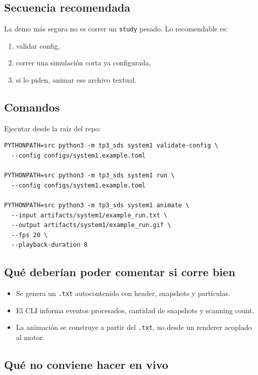 \documentclass[11pt]{article}
\begin{document}
\subsection{Secuencia recomendada}

La demo m\'as segura no es correr un \texttt{study} pesado. Lo recomendable es:

\begin{enumerate}
  \item validar config,
  \item correr una simulaci\'on corta ya configurada,
  \item si lo piden, animar ese archivo textual.
\end{enumerate}

\subsection{Comandos}

Ejecutar desde la ra\'iz del repo:

\begin{verbatim}
PYTHONPATH=src python3 -m tp3_sds system1 validate-config \
  --config configs/system1.example.toml

PYTHONPATH=src python3 -m tp3_sds system1 run \
  --config configs/system1.example.toml

PYTHONPATH=src python3 -m tp3_sds system1 animate \
  --input artifacts/system1/example_run.txt \
  --output artifacts/system1/example_run.gif \
  --fps 20 \
  --playback-duration 8
\end{verbatim}

\subsection{Qu\'e deber\'ian poder comentar si corre bien}

\begin{itemize}
  \item Se genera un \texttt{.txt} autocontenido con header, snapshots y part\'iculas.
  \item El CLI informa eventos procesados, cantidad de snapshots y scanning count.
  \item La animaci\'on se construye a partir del \texttt{.txt}, no desde un renderer acoplado al motor.
\end{itemize}

\subsection{Qu\'e no conviene hacer en vivo}
\end{document}

